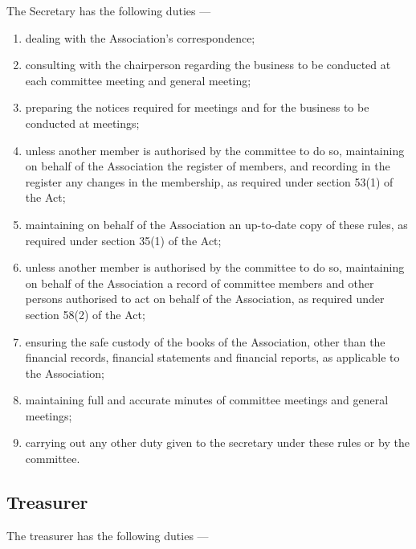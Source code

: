 \documentclass[../constitution.tex]{subfiles}
\begin{document}
The Secretary has the following duties ---

\begin{enumerate}
  \item dealing with the Association's correspondence;
  \item consulting with the chairperson regarding the business to be conducted at each committee meeting and general meeting;
  \item preparing the notices required for meetings and for the business to be conducted at meetings;
  \item unless another member is authorised by the committee to do so, maintaining on behalf of the Association the register of members, and recording in the register any changes in the membership, as required under section 53(1) of the Act;
  \item maintaining on behalf of the Association an up-to-date copy of these rules, as required under section 35(1) of the Act;
  \item unless another member is authorised by the committee to do so, maintaining on behalf of the Association a record of committee members and other persons authorised to act on behalf of the Association, as required under section 58(2) of the Act;
  \item ensuring the safe custody of the books of the Association, other than the financial records, financial statements and financial reports, as applicable to the Association;
  \item maintaining full and accurate minutes of committee meetings and general meetings;
  \item carrying out any other duty given to the secretary under these rules or by the committee.
\end{enumerate}

\hypertarget{treasurer}{%
  \subsection{Treasurer}\label{treasurer}}

The treasurer has the following duties ---
\end{document}
